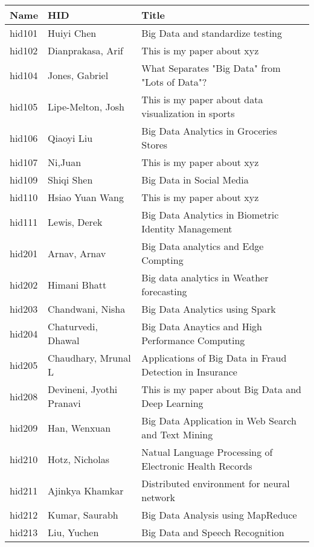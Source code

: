 \documentclass[12pt]{article}
\begin{document}
\begin{footnotesize}
\begin{longtable}{|p{1cm}p{5cm}p{9cm}|}
\hline \textbf{Name} & \textbf{HID} & \textbf{Title} \\ \hline \hline

hid101 & Huiyi Chen & Big Data and standardize testing  \\
\hline
hid102 & Dianprakasa, Arif & This is my paper about xyz  \\
\hline
hid104 & Jones, Gabriel & What Separates "Big Data" from "Lots of Data"?  \\
\hline
hid105 & Lipe-Melton, Josh & This is my paper about data visualization in sports  \\
\hline
hid106 & Qiaoyi Liu & Big Data Analytics in Groceries Stores  \\
\hline
hid107 & Ni,Juan & This is my paper about xyz  \\
\hline
hid109 & Shiqi Shen & Big Data in Social Media  \\
\hline
hid110 & Hsiao Yuan Wang & This is my paper about xyz  \\
\hline
hid111 & Lewis, Derek & Big Data Analytics in Biometric Identity Management  \\
\hline
hid201 & Arnav, Arnav & Big Data analytics and Edge Compting  \\
\hline
hid202 & Himani Bhatt & Big data analytics in Weather forecasting  \\
\hline
hid203 & Chandwani, Nisha & Big Data Analytics using Spark  \\
\hline
hid204 & Chaturvedi, Dhawal & Big Data Anaytics and High Performance Computing  \\
\hline
hid205 & Chaudhary, Mrunal L & Applications of Big Data in Fraud Detection in Insurance  \\
\hline
hid208 & Devineni, Jyothi Pranavi & This is my paper about Big Data and Deep Learning  \\
\hline
hid209 & Han, Wenxuan & Big Data Application in Web Search and Text Mining  \\
\hline
hid210 & Hotz, Nicholas & Natual Language Processing of Electronic Health Records  \\
\hline
hid211 & Ajinkya Khamkar & Distributed environment for neural network  \\
\hline
hid212 & Kumar, Saurabh & Big Data Analysis using MapReduce  \\
\hline
hid213 & Liu, Yuchen & Big Data and Speech Recognition  \\

\end{longtable}
\end{footnotesize}
\end{document}
